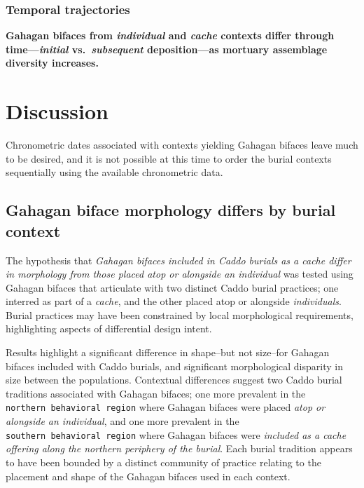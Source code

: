\documentclass[]{interact}
\theoremstyle{plain}%
\theoremstyle{definition}
\theoremstyle{remark}
\begin{document}
\hypertarget{temporal-trajectories}{%
\subsubsection{Temporal trajectories}\label{temporal-trajectories}}

\textbf{Gahagan bifaces from \emph{individual} and \emph{cache} contexts
differ through time---\emph{initial} vs.~\emph{subsequent}
deposition---as mortuary assemblage diversity increases.}

\hypertarget{discussion}{%
\section{Discussion}\label{discussion}}

Chronometric dates associated with contexts yielding Gahagan bifaces
leave much to be desired, and it is not possible at this time to order
the burial contexts sequentially using the available chronometric data.

\hypertarget{gahagan-biface-morphology-differs-by-burial-context}{%
\subsection{Gahagan biface morphology differs by burial
context}\label{gahagan-biface-morphology-differs-by-burial-context}}

The hypothesis that \emph{Gahagan bifaces included in Caddo burials as a
cache differ in morphology from those placed atop or alongside an
individual} was tested using Gahagan bifaces that articulate with two
distinct Caddo burial practices; one interred as part of a \emph{cache},
and the other placed atop or alongside \emph{individuals}. Burial
practices may have been constrained by local morphological requirements,
highlighting aspects of differential design intent.

Results highlight a significant difference in shape--but not size--for
Gahagan bifaces included with Caddo burials, and significant
morphological disparity in size between the populations. Contextual
differences suggest two Caddo burial traditions associated with Gahagan
bifaces; one more prevalent in the \texttt{northern\ behavioral\ region}
where Gahagan bifaces were placed \emph{atop or alongside an
individual}, and one more prevalent in the
\texttt{southern\ behavioral\ region} where Gahagan bifaces were
\emph{included as a cache offering along the northern periphery of the
burial}. Each burial tradition appears to have been bounded by a
distinct community of practice relating to the placement and shape of
the Gahagan bifaces used in each context.
\end{document}
